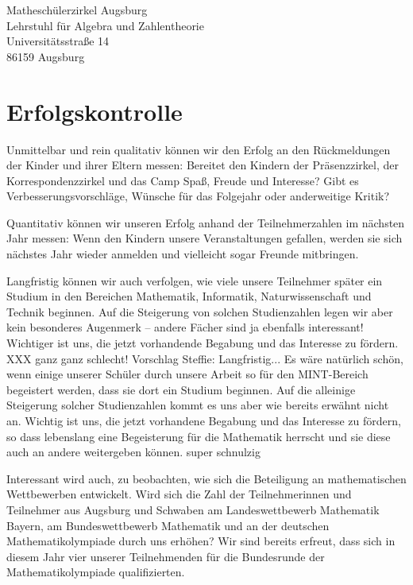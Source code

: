 \documentclass[12pt]{zettel}
\begin{document}
\begin{tabbing}
  Matheschülerzirkel Augsburg \\
  Lehrstuhl für Algebra und Zahlentheorie \\
  Universitätsstraße 14 \\
  86159 Augsburg
\end{tabbing}


\section{Erfolgskontrolle}

Unmittelbar und rein qualitativ können wir den Erfolg an den Rückmeldungen der
Kinder und ihrer Eltern messen: Bereitet den Kindern der Präsenzzirkel, der
Korrespondenzzirkel und das Camp Spaß, Freude und Interesse? Gibt es
Verbesserungsvorschläge, Wünsche für das Folgejahr oder anderweitige Kritik?

Quantitativ können wir unseren Erfolg anhand der Teilnehmerzahlen im nächsten
Jahr messen: Wenn den Kindern unsere Veranstaltungen gefallen, werden sie sich
nächstes Jahr wieder anmelden und vielleicht sogar Freunde mitbringen.

Langfristig können wir auch verfolgen, wie viele unsere Teilnehmer später ein
Studium in den Bereichen Mathematik, Informatik, Naturwissenschaft und Technik
beginnen. Auf die Steigerung von solchen Studienzahlen legen wir aber kein
besonderes Augenmerk -- andere Fächer sind ja ebenfalls interessant! Wichtiger
ist uns, die jetzt vorhandende Begabung und das Interesse zu fördern. XXX ganz
ganz schlecht!
Vorschlag Steffie:
Langfristig... Es wäre natürlich schön, wenn einige unserer Schüler durch
unsere Arbeit so für den MINT-Bereich begeistert werden, dass sie dort ein
Studium beginnen. Auf die alleinige Steigerung solcher Studienzahlen kommt es
uns aber wie bereits erwähnt nicht an. Wichtig ist uns, die jetzt vorhandene
Begabung und das Interesse zu fördern, so dass lebenslang eine Begeisterung für
die Mathematik herrscht und sie diese auch an andere weitergeben können.
super schnulzig

Interessant wird auch, zu beobachten, wie sich die Beteiligung an
mathematischen Wettbewerben entwickelt. Wird sich die Zahl der
Teilnehmerinnen und Teilnehmer aus Augsburg und Schwaben am Landeswettbewerb
Mathematik Bayern, am Bundeswettbewerb Mathematik und an der deutschen
Mathematikolympiade durch uns erhöhen? Wir sind bereits erfreut,
dass sich in diesem Jahr vier unserer Teilnehmenden für die
Bundesrunde der Mathematikolympiade qualifizierten.
\end{document}
